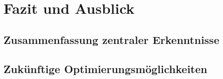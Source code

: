 \section{Fazit und Ausblick} %

\subsection{Zusammenfassung zentraler Erkenntnisse}

\subsection{Zukünftige Optimierungsmöglichkeiten}
